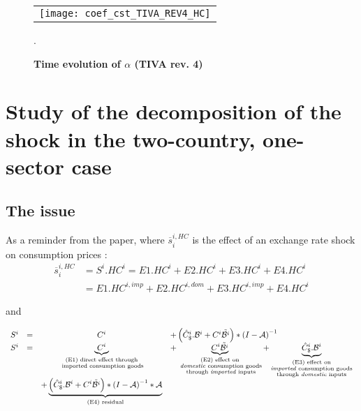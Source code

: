 \documentclass[11pt,a4paper]{article}
\begin{document}
\begin{appendices}
\begin{figure}[!h]
	\centering
	\caption{\footnotesize{\textbf{Time evolution of $\alpha$ (TIVA rev. 4)}}}
	\begin{tabular}{c}
		\texttt{[image: coef\_cst\_TIVA\_REV4\_HC]}\\
	\end{tabular}
	\label{fig:evolution_cst_TiVA_REV4}
	.
\end{figure}


\newpage
\section{Study of the decomposition of the shock in the two-country, one-sector case}\label{AnalyticalAppendix}
\subsection{The issue}

As a reminder from the paper, where $\overline{s}_{i}^{i,HC}$ is the effect of an exchange rate shock on consumption prices :  
\begin{equation}
\begin{array}{lccl}
\overline{s}_{i}^{i,HC}&=S^i.HC^i=E1.HC^i+E2.HC^i+E3.HC^i+E4.HC^i \\
&=E1.HC^{i,imp}+E2.HC^{i,dom}+E3.HC^{i,imp}+E4.HC^i
\end{array} 
\end{equation}

and

\begin{equation}
\begin{array}{lccl}
S^ i&=&C^i	&+ \left(\hat{C}^i_\$.{\cal B}^i+{C^i}{\tilde{{\cal B}^i}}\right)*{{(I-{\cal A})}^{-1}} \\
S^i &=&\underbrace{C^i}_{\substack{\text{(E1) direct effect through} \\ \text{ imported consumption goods}}}&+ \underbrace{{C^i}{\tilde{{\cal B}^i}}}_{\substack{\text{(E2) effect on} \\ \text{ \emph{domestic} consumption goods} \\ \text{ through \emph{imported} inputs}}}  + \underbrace{\hat{C}^i_\$.{\cal B}^i}_{\substack{\text{(E3)  effect on} \\ \text{\emph{imported} consumption goods} \\ \text{through \emph{domestic} inputs}}} \\ &&+\underbrace {\left( \hat{C}^i_\$.{\cal B}^i + {C^i}{\tilde{{\cal B}^i}}\right)*{{(I-{\cal A})}^{-1}}*{\cal A}}_{\text{(E4) residual}} \\
\end{array}
\end{equation}




\end{appendices}
\end{document}
